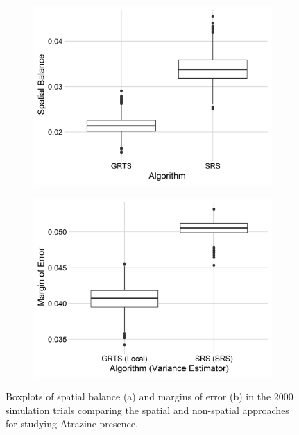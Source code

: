 \documentclass[
  shortnames]{jss}
\begin{document}
\begin{figure}
\centering
\begin{subfigure}{0.45\textwidth}
  \centering
  \includegraphics[width = 1\linewidth]{images/cat_spb.jpeg}
  \caption{}
  \label{fig:cat_moe}
\end{subfigure}
\begin{subfigure}{0.45\textwidth}
  \centering
  \includegraphics[width = 1\linewidth]{images/cat_moe.jpeg}
  \caption{}
  \label{fig:cat_spb}
\end{subfigure}
\caption{Boxplots of spatial balance (a) and margins of error (b) in the 2000 simulation trials comparing the spatial and non-spatial approaches for studying Atrazine presence.}
\label{fig:cat}
\end{figure}
\end{document}
